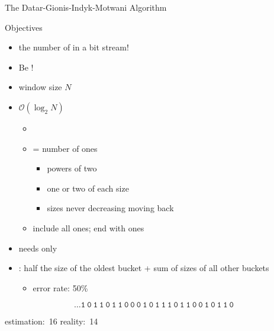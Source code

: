 \begin{frame}{The Datar-Gionis-Indyk-Motwani Algorithm}
	\begin{block}{Objectives}
		\begin{itemize}
			\item
			 the number of  in a bit stream!

			\item
			Be !
		\end{itemize}
	\end{block}
	\begin{itemize}
		\item
		window size $N$

		\item
		$\mathcal{O}(\log_2 N)$ 
		\begin{itemize}
			\item

			\item
			 = number of ones
			\begin{itemize}
				\item
				powers of two

				\item
				one or two of each size

				\item
				sizes never decreasing moving back
			\end{itemize}

			\item
			include all ones; end with ones
		\end{itemize}
	
		\item
		needs only  
	
		\item
		: half the size of the oldest bucket + sum of sizes of all other buckets
		\begin{itemize}
			\item
			error rate: 50\%
		\end{itemize}
	\end{itemize}
	\vspace{1mm}
	{
		\Large
		\begin{equation*}
			\mathtt{\boxed{\dots 1 ~ 0 ~ 1} ~ \boxed{1 ~ 0 ~ 1 ~ 1 ~ 0 ~ 0 ~ 0 ~ 1} ~ 0 ~ \boxed{1 ~ 1 ~ 1 ~ 0 ~ 1} ~ \boxed{1 ~ 0 ~ 0 ~ 1} ~ 0 ~ \boxed{1} ~ \boxed{1} ~ 0}
		\end{equation*}
	}
	\begin{center}
		\small
		estimation:~16 \qquad\qquad reality:~14
	\end{center}
\end{frame}